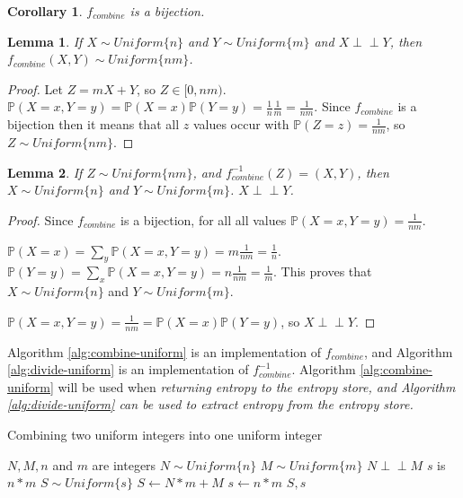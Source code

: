 \documentclass[12pt]{article}
\newtheorem{lemma}{Lemma}
\newtheorem{corollary}{Corollary}
\newcommand{\indep}{\perp\!\!\!\perp}
\begin{document}
\begin{corollary}
    $f_{combine}$ is a bijection.
\end{corollary}

\begin{lemma}
    If $X \sim Uniform\{n\}$ and $Y \sim Uniform\{m\}$ and $X \indep Y$, then 
    $f_{combine}(X,Y) \sim Uniform \{nm\}$.
\end{lemma}

\begin{proof}
    Let $Z = mX+Y$, so $Z \in [0,nm)$. $\mathbb{P}(X=x,Y=y) = \mathbb{P}(X=x)\mathbb{P}(Y=y) = \frac{1}{n}\frac{1}{m} = \frac{1}{nm}$. Since $f_{combine}$ is a bijection then it means that all $z$ values occur with $\mathbb{P}(Z=z) = \frac{1}{nm}$, so $Z \sim Uniform\{nm\}$.
    
\end{proof}

\begin{lemma}
    If $Z \sim Uniform \{nm\}$, and $f^{-1}_{combine}(Z) = (X,Y)$, then $X \sim Uniform\{n\}$ and $Y \sim Uniform\{m\}$. $X \indep Y$.
    \label{lem:combine-independent}
\end{lemma}

\begin{proof}
    Since $f_{combine}$ is a bijection, for all all values $\mathbb{P}(X=x,Y=y) = \frac{1}{nm}$.

    $\mathbb{P}(X=x) = \sum_{y}\mathbb{P}(X=x,Y=y) = m\frac{1}{nm} = \frac{1}{n}$. $\mathbb{P}(Y=y) = \sum_{x}\mathbb{P}(X=x,Y=y) = n\frac{1}{nm} = \frac{1}{m}$. This proves that $X\sim Uniform\{n\}$ and $Y\sim Uniform\{m\}$.

    $\mathbb{P}(X=x,Y=y) = \frac{1}{nm} = \mathbb{P}(X=x)\mathbb{P}(Y=y)$, so $X \indep Y$.
\end{proof}

Algorithm \ref{alg:combine-uniform} is an implementation of $f_{combine}$, and Algorithm \ref{alg:divide-uniform} is an implementation of $f^{-1}_{combine}$. Algorithm \ref{alg:combine-uniform} will be used when \em returning \em entropy to the entropy store, and Algorithm \ref{alg:divide-uniform} can be used to extract entropy from the entropy store.

\begin{algorithm}
\caption{Combining two uniform integers into one uniform integer}
\label{alg:combine-uniform}
\begin{algorithmic}[1]
    \Require $N, M, n$ and $m$ are integers
    \Require $N \sim Uniform\{n\}$
    \Require $M \sim Uniform\{m\}$
    \Require $N \indep M$
    \Ensure $s$ is $n * m$
    \Ensure $S \sim Uniform\{s\}$
  \State $S \gets N * m + M$
  \State $s \gets n * m$
  \State \Return $S, s$
\EndProcedure
\end{algorithmic}
\end{algorithm}
\end{document}
